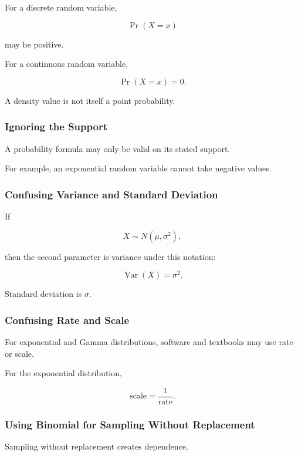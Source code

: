 For a discrete random variable,

\[
\Pr(X=x)
\]

may be positive.

For a continuous random variable,

\[
\boxed{
\Pr(X=x)=0.
}
\]

A density value is not itself a point probability.

\subsubsection{Ignoring the Support}

A probability formula may only be valid on its stated support.

For example, an exponential random variable cannot take negative values.

\subsubsection{Confusing Variance and Standard Deviation}

If

\[
X\sim N(\mu,\sigma^2),
\]

then the second parameter is variance under this notation:

\[
\boxed{
\operatorname{Var}(X)=\sigma^2.
}
\]

Standard deviation is \(\sigma\).

\subsubsection{Confusing Rate and Scale}

For exponential and Gamma distributions, software and textbooks may use rate
or scale.

For the exponential distribution,

\[
\boxed{
\text{scale}
=
\frac1{\text{rate}}.
}
\]

\subsubsection{Using Binomial for Sampling Without Replacement}

Sampling without replacement creates dependence.

